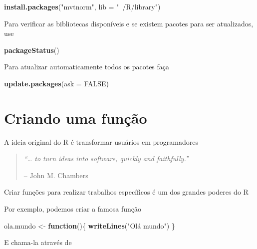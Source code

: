 \documentclass[10pt,a4paper]{book}
\newenvironment{Shaded}{\begin{snugshade}}{\end{snugshade}}
\newcommand{\KeywordTok}[1]{\textcolor[rgb]{0.13,0.29,0.53}{\textbf{#1}}}
\newcommand{\DataTypeTok}[1]{\textcolor[rgb]{0.13,0.29,0.53}{#1}}
\newcommand{\StringTok}[1]{\textcolor[rgb]{0.31,0.60,0.02}{#1}}
\newcommand{\OtherTok}[1]{\textcolor[rgb]{0.56,0.35,0.01}{#1}}
\newcommand{\ControlFlowTok}[1]{\textcolor[rgb]{0.13,0.29,0.53}{\textbf{#1}}}
\newcommand{\NormalTok}[1]{#1}
\begin{document}
\begin{Shaded}
\begin{Highlighting}[]
\KeywordTok{install.packages}\NormalTok{(}\StringTok{"mvtnorm"}\NormalTok{, }\DataTypeTok{lib =} \StringTok{"~/R/library"}\NormalTok{)}
\end{Highlighting}
\end{Shaded}

Para verificar as bibliotecas disponíveis e se existem pacotes para ser
atualizados, use

\begin{Shaded}
\begin{Highlighting}[]
\KeywordTok{packageStatus}\NormalTok{()}
\end{Highlighting}
\end{Shaded}

Para atualizar automaticamente todos os pacotes faça

\begin{Shaded}
\begin{Highlighting}[]
\KeywordTok{update.packages}\NormalTok{(}\DataTypeTok{ask =} \OtherTok{FALSE}\NormalTok{)}
\end{Highlighting}
\end{Shaded}

\section{Criando uma função}\label{criando-uma-funcao}

A ideia original do R é transformar usuários em programadores

\begin{quote}
\emph{``\ldots{} to turn ideas into software, quickly and faithfully.''}

-- John M. Chambers
\end{quote}

Criar funções para realizar trabalhos específicos é um dos grandes
poderes do R

Por exemplo, podemos criar a famosa função

\begin{Shaded}
\begin{Highlighting}[]
\NormalTok{ola.mundo <-}\StringTok{ }\ControlFlowTok{function}\NormalTok{()\{}
    \KeywordTok{writeLines}\NormalTok{(}\StringTok{"Olá mundo"}\NormalTok{)}
\NormalTok{\}}
\end{Highlighting}
\end{Shaded}

E chama-la através de
\end{document}
